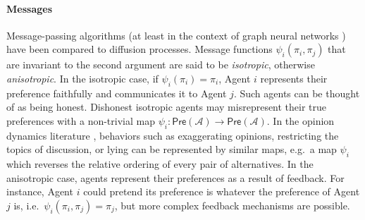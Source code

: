 \documentclass[conference]{ieeeconf}
\newcommand{\A}{\mathcal{A}}
\newcommand{\Pref}{\mathsf{Pre}}
\begin{document}
\paragraph{Messages}
Message-passing algorithms (at least in the context of graph neural networks \cite{tailor2021}) have been compared to diffusion processes. Message functions $\psi_i(\pi_i,\pi_j)$ that are invariant to the second argument are said to be \emph{isotropic}, otherwise \emph{anisotropic}. In the isotropic case, if $\psi_i(\pi_i) = \pi_i$, Agent $i$ represents their preference faithfully and communicates it to Agent $j$. Such agents can be thought of as being honest. Dishonest isotropic agents may misrepresent their true preferences with a non-trivial map $\psi_i: \Pref(\A) \to \Pref(\A)$. In the opinion dynamics literature \cite{hansen2021}, behaviors such as exaggerating opinions, restricting the topics of discussion, or lying can be represented by similar maps, e.g.~a map $\psi_i$ which reverses the relative ordering of every pair of alternatives.
In the anisotropic case, agents represent their preferences as a result of feedback. For instance, Agent $i$ could pretend its preference is whatever the preference of Agent $j$ is, i.e.~$\psi_i(\pi_i,\pi_j) = \pi_j$, but more complex feedback mechanisms are possible.
\end{document}
